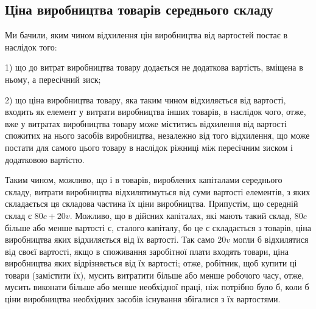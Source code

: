 
\subsection{Ціна виробництва товарів середнього складу}

Ми бачили, яким чином відхилення цін виробництва від вартостей постає в наслідок того:

1) що до витрат виробництва товару додається не додаткова вартість, вміщена в ньому, а
пересічний зиск;

2) що ціна виробництва товару, яка таким чином відхиляється від вартості, входить як елемент
у витрати виробництва інших товарів, в наслідок чого, отже, вже у витратах виробництва товару може
міститись відхилення від вартості спожитих на нього засобів виробництва, незалежно від того
відхилення, що може постати для самого цього товару в наслідок ріжниці між пересічним зиском і
додатковою вартістю.

Таким чином, можливо, що і в товарів, вироблених капіталами середнього складу, витрати виробництва
відхилятимуться від суми вартості елементів, з яких складається ця складова частина їх ціни
виробництва. Припустім, що середній склад є $80 c + 20 v$. Можливо, що в дійсних капіталах, які мають
такий склад, $80  c$ більше або менше вартості $с$, сталого капіталу, бо це $с$ складається з товарів,
ціна виробництва яких відхиляється від їх вартості. Так само $20 v$  могли б відхилятися від своєї
вартості, якщо в споживання заробітної плати входять товари, ціна виробництва яких відрізняється від
їх вартості; отже, робітник, щоб купити ці товари (замістити їх), мусить витратити більше або менше
робочого часу, отже, мусить виконати більше або менше необхідної праці, ніж потрібно було б, коли б
ціни виробництва
необхідних засобів існування збігалися з їх вартостями.

